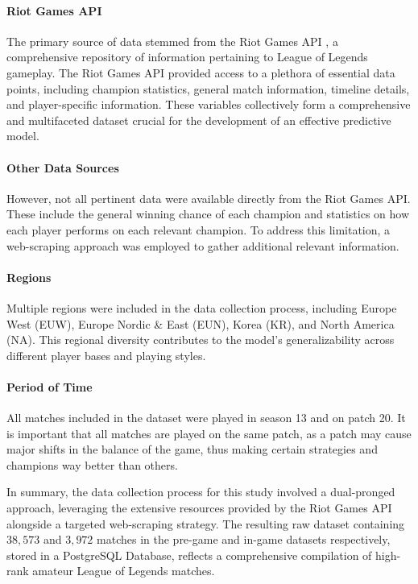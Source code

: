 \documentclass[12pt, a4paper, headinclude, twoside, plainheadsepline, open=right, numbers=noenddot, hidelinks, toc=listof, toc=bibliography]{scrreprt}
\begin{document}
\paragraph{Riot Games API}
The primary source of data stemmed from the Riot Games API \cite{RiotDeveloperPortal}, a comprehensive repository of information pertaining to League of Legends gameplay.
The Riot Games API provided access to a plethora of essential data points, including champion statistics, general match information, timeline details, and player-specific information.
These variables collectively form a comprehensive and multifaceted dataset crucial for the development of an effective predictive model.
\paragraph{Other Data Sources}
However, not all pertinent data were available directly from the Riot Games API.
These include the general winning chance of each champion and statistics on how each player performs on each relevant champion.
To address this limitation, a web-scraping approach was employed to gather additional relevant information. 
\paragraph{Regions}
Multiple regions were included in the data collection process, including Europe West (EUW), Europe Nordic \& East (EUN), Korea (KR), and North America (NA).
This regional diversity contributes to the model's generalizability across different player bases and playing styles.
\paragraph{Period of Time}
All matches included in the dataset were played in season 13 and on patch 20.
It is important that all matches are played on the same patch, as a patch may cause major shifts in the balance of the game, thus making certain strategies and champions way better than others.

In summary, the data collection process for this study involved a dual-pronged approach, leveraging the extensive resources provided by the Riot Games API alongside a targeted web-scraping strategy.
The resulting raw dataset containing $38,573$ and  $3,972$ matches in the pre-game and in-game datasets respectively, stored in a PostgreSQL Database, reflects a comprehensive compilation of high-rank amateur League of Legends matches.
\end{document}
